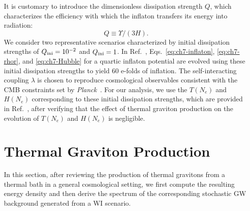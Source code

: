 It is customary to introduce the dimensionless dissipation strength $Q$, which characterizes the efficiency with which the inflaton transfers its energy into radiation:
\begin{equation}
    Q\equiv \Upsilon/(3H).
\end{equation}
We consider two representative scenarios characterized by initial dissipation strengths of $Q_{\rm ini} = 10^{-2}$ and $Q_{\rm ini} = 1$. In Ref.~\cite{Freese:2024ogj}, Eqs.~\eqref{eq:ch7-inflaton}, \eqref{eq:ch7-rhor}, and \eqref{eq:ch7-Hubble} for a quartic inflaton potential are evolved using these initial dissipation strengths to yield 60 e-folds of inflation. The self-interacting coupling $\lambda$ is chosen to reproduce cosmological observables consistent with the CMB constraints set by \textit{Planck}~\cite{Planck:2018jri}. For our analysis, we use the $T(N_e)$ and $H(N_e)$ corresponding to these initial dissipation strengths, which are provided in Ref.~\cite{Freese:2024ogj}, after verifying that the effect of thermal graviton production on the evolution of $T(N_e)$ and $H(N_e)$ is negligible.

\section{Thermal Graviton Production}
\label{sec:ch7-thermalgraviton}
In this section, after reviewing the production of thermal gravitons from a thermal bath in a general cosmological setting,  we first compute the resulting energy density and then derive the spectrum of the corresponding stochastic GW background generated from a WI scenario.

